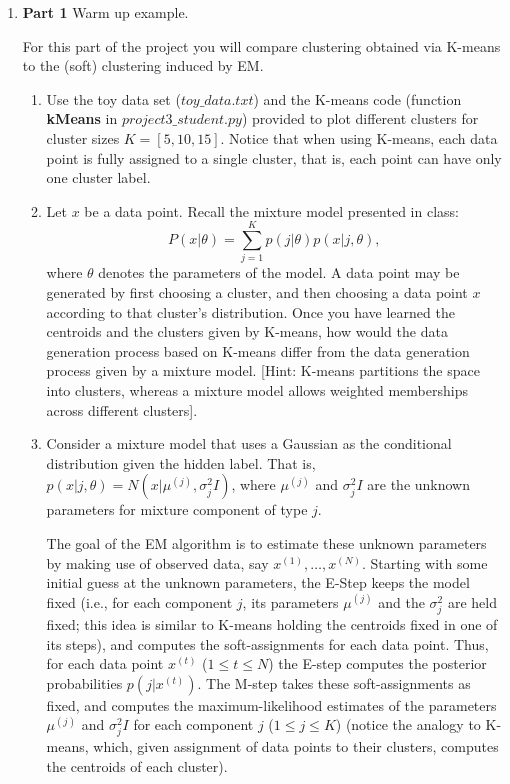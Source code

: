 \begin{enumerate}

\item {\bf Part 1} Warm up example.

For this part of the project you will compare clustering obtained via K-means to the (soft) clustering induced by EM.

\begin{enumerate}
  \item Use the toy data set (\texttt{$toy\_data.txt$}) and the K-means code (function \textbf{kMeans} in \texttt{$project3\_student.py$}) provided to plot different clusters for cluster sizes $K = [5, 10, 15]$. Notice that when using K-means, each data point is fully assigned to a single cluster, that is, each point can have only one cluster label.
  \item Let $x$ be a data point. Recall the mixture model presented in class: $$P(x | \theta) = \sum^{K}_{j=1} p(j| \theta)p(x | j, \theta),$$ where $\theta$ denotes the parameters of the model. A data point may be generated by first choosing a cluster, and then choosing a data point $x$ according to that cluster's distribution. Once you have learned the centroids and the clusters given by K-means, how would the data generation process based on K-means differ from the data generation process given by a mixture model. [Hint: K-means partitions the space into clusters, whereas a mixture model allows weighted memberships across different clusters].
  \item Consider a mixture model that uses a Gaussian as the conditional distribution given the hidden label. That is, $p(x | j, \theta) = N(x | \mu^{(j)}, \sigma^2_{j} I)$, where $\mu^{(j)}$ and $\sigma^2_jI$ are the unknown parameters for mixture component of type $j$.

    The goal of the EM algorithm is to estimate these unknown parameters by making use of observed data, say $x^{(1)},\ldots, x^{(N)}$. Starting with some initial guess at the unknown parameters, the E-Step keeps the model fixed (i.e., for each component $j$, its parameters $\mu^{(j)}$ and the $\sigma^2_{j}$ are held fixed; this idea is similar to K-means holding the centroids fixed in one of its steps), and computes the soft-assignments for each data point. Thus, for each data point $x^{(t)}$ ($1 \le t \le N$) the E-step computes the posterior probabilities $p(j | x^{(t)})$. The M-step takes these soft-assignments as fixed, and computes the maximum-likelihood estimates of the parameters $\mu^{(j)}$ and $\sigma_j^2I$ for each component $j$ ($1 \le j \le K$) (notice the analogy to K-means, which, given assignment of data points to their clusters, computes the centroids of each cluster).


\end{enumerate}
\end{enumerate}
